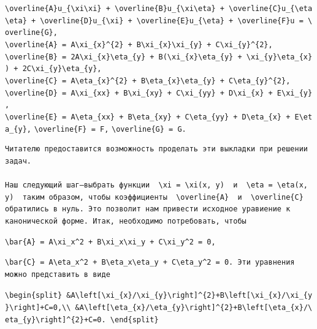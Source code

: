 \documentclass[
  ukrainian,
]{article}
\begin{document}
\texttt{\textbackslash{}overline\{A\}u\_\{\textbackslash{}xi\textbackslash{}xi\}\ +\ \textbackslash{}overline\{B\}u\_\{\textbackslash{}xi\textbackslash{}eta\}\ +\ \textbackslash{}overline\{C\}u\_\{\textbackslash{}eta\textbackslash{}eta\}\ +\ \textbackslash{}overline\{D\}u\_\{\textbackslash{}xi\}\ +\ \textbackslash{}overline\{E\}u\_\{\textbackslash{}eta\}\ +\ \textbackslash{}overline\{F\}u\ =\ \textbackslash{}overline\{G\},}
\texttt{\textbackslash{}overline\{A\}\ =\ A\textbackslash{}xi\_\{x\}\^{}\{2\}\ +\ B\textbackslash{}xi\_\{x\}\textbackslash{}xi\_\{y\}\ +\ C\textbackslash{}xi\_\{y\}\^{}\{2\},}
\texttt{\textbackslash{}overline\{B\}\ =\ 2A\textbackslash{}xi\_\{x\}\textbackslash{}eta\_\{y\}\ +\ B(\textbackslash{}xi\_\{x\}\textbackslash{}eta\_\{y\}\ +\ \textbackslash{}xi\_\{y\}\textbackslash{}eta\_\{x\})\ +\ 2C\textbackslash{}xi\_\{y\}\textbackslash{}eta\_\{y\},}
\texttt{\textbackslash{}overline\{C\}\ =\ A\textbackslash{}eta\_\{x\}\^{}\{2\}\ +\ B\textbackslash{}eta\_\{x\}\textbackslash{}eta\_\{y\}\ +\ C\textbackslash{}eta\_\{y\}\^{}\{2\},}
\texttt{\textbackslash{}overline\{D\}\ =\ A\textbackslash{}xi\_\{xx\}\ +\ B\textbackslash{}xi\_\{xy\}\ +\ C\textbackslash{}xi\_\{yy\}\ +\ D\textbackslash{}xi\_\{x\}\ +\ E\textbackslash{}xi\_\{y\},}
\texttt{\textbackslash{}overline\{E\}\ =\ A\textbackslash{}eta\_\{xx\}\ +\ B\textbackslash{}eta\_\{xy\}\ +\ C\textbackslash{}eta\_\{yy\}\ +\ D\textbackslash{}eta\_\{x\}\ +\ E\textbackslash{}eta\_\{y\},}
\texttt{\textbackslash{}overline\{F\}\ =\ F,}
\texttt{\textbackslash{}overline\{G\}\ =\ G.}

\begin{verbatim}
Читателю предоставится возможность проделать эти выкладки при решении задач.

Наш следующий шаг—выбрать функции  \xi = \xi(x, y)  и  \eta = \eta(x, y)  таким образом, чтобы коэффициенты  \overline{A}  и  \overline{C}  обратились в нуль. Это позволит нам привести исходное уравиение к канонической форме. Итак, необходимо потребовать, чтобы
\end{verbatim}

\texttt{\textbackslash{}bar\{A\}\ =\ A\textbackslash{}xi\_x\^{}2\ +\ B\textbackslash{}xi\_x\textbackslash{}xi\_y\ +\ C\textbackslash{}xi\_y\^{}2\ =\ 0,}

\begin{verbatim}
\bar{C} = A\eta_x^2 + B\eta_x\eta_y + C\eta_y^2 = 0. Эти уравнения можно представить в виде
\end{verbatim}

\texttt{\textbackslash{}begin\{split\}\ \&A\textbackslash{}left{[}\textbackslash{}xi\_\{x\}/\textbackslash{}xi\_\{y\}\textbackslash{}right{]}\^{}\{2\}+B\textbackslash{}left{[}\textbackslash{}xi\_\{x\}/\textbackslash{}xi\_\{y\}\textbackslash{}right{]}+C=0,\textbackslash{}\textbackslash{}\ \&A\textbackslash{}left{[}\textbackslash{}eta\_\{x\}/\textbackslash{}eta\_\{y\}\textbackslash{}right{]}\^{}\{2\}+B\textbackslash{}left{[}\textbackslash{}eta\_\{x\}/\textbackslash{}eta\_\{y\}\textbackslash{}right{]}\^{}\{2\}+C=0.\ \textbackslash{}end\{split\}}
\end{document}
